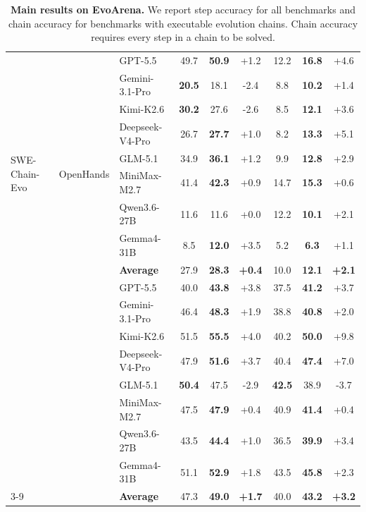 \documentclass{llmxive}
\begin{document}
\begin{table}[t]
{\begin{tabular}{lllcccccc}
\multirow{10}{*}{SWE-Chain-Evo}
& \multirow{10}{*}{OpenHands}
& GPT-5.5 & 49.7 & \textbf{50.9} & +1.2 & 12.2 & \textbf{16.8} & +4.6 \\
& & Gemini-3.1-Pro & \textbf{20.5} & 18.1 & -2.4 & 8.8 & \textbf{10.2} & +1.4 \\
& & Kimi-K2.6 & \textbf{30.2} & 27.6 & -2.6 & 8.5 & \textbf{12.1} & +3.6 \\
& & Deepseek-V4-Pro & 26.7 & \textbf{27.7} & +1.0 & 8.2 & \textbf{13.3} & +5.1 \\
& & GLM-5.1 & 34.9 & \textbf{36.1} & +1.2 & 9.9 & \textbf{12.8} & +2.9 \\
& & MiniMax-M2.7 & 41.4 & \textbf{42.3} & +0.9 & 14.7 & \textbf{15.3} & +0.6 \\
& & Qwen3.6-27B & 11.6 & 11.6 & +0.0 & 12.2 & \textbf{10.1} & +2.1 \\
& & Gemma4-31B & 8.5 & \textbf{12.0} & +3.5 & 5.2 & \textbf{6.3} & +1.1 \\
\cmidrule(l){3-9}
& & \textbf{Average} & 27.9 & \textbf{28.3} & \textbf{+0.4} & 10.0 & \textbf{12.1} & \textbf{+2.1} \\
\cmidrule(l){1-9}


\multirow{8}{*}{PersonaMem-Evo}
  & \multirow{8}{*}{A-Mem}
  & GPT-5.5 & 40.0 & \textbf{43.8} & +3.8 & 37.5 & \textbf{41.2} & +3.7 \\
  & & Gemini-3.1-Pro & 46.4 & \textbf{48.3} & +1.9 & 38.8 & \textbf{40.8} & +2.0 \\
  & & Kimi-K2.6 & 51.5 & \textbf{55.5} & +4.0 & 40.2 & \textbf{50.0} & +9.8 \\
  & & Deepseek-V4-Pro & 47.9 & \textbf{51.6} & +3.7 & 40.4 & \textbf{47.4} & +7.0 \\
  & & GLM-5.1 & \textbf{50.4} & 47.5 & -2.9 & \textbf{42.5} & 38.9 & -3.7 \\
  & & MiniMax-M2.7 & 47.5 & \textbf{47.9} & +0.4 & 40.9 & \textbf{41.4} & +0.4 \\
  & & Qwen3.6-27B & 43.5 & \textbf{44.4} & +1.0 & 36.5 & \textbf{39.9} & +3.4 \\
    & & Gemma4-31B & 51.1 & \textbf{52.9} & +1.8 & 43.5 & \textbf{45.8} & +2.3 \\
  \cmidrule(l){3-9}
  & & \textbf{Average} & 47.3 & \textbf{49.0} & \textbf{+1.7} & 40.0 & \textbf{43.2} & \textbf{+3.2} \\


\bottomrule
\end{tabular}
}
\vspace{-3mm}
\label{tab:main_results}
\caption{ \small
\textbf{Main results on EvoArena.}
We report step accuracy for all benchmarks and chain accuracy for benchmarks with executable evolution chains. Chain accuracy requires every step in a chain to be solved.
}
\end{table}
\end{document}
